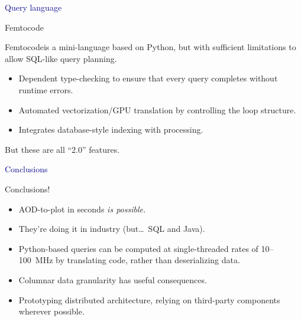 \documentclass{beamer}
\begin{document}
\begin{frame}
\begin{center}
\huge \textcolor{darkblue}{Query language}
\end{center}
\end{frame}

\begin{frame}{Femtocode}
\vspace{0.5 cm}

Femtocode\footnotemark[1] is a mini-language based on Python, but with sufficient limitations to allow SQL-like query planning.

\vspace{0.25 cm}
\begin{itemize}\setlength{\itemsep}{0.25 cm}
\item Dependent type-checking to ensure that every query completes without runtime errors.
\item Automated vectorization/GPU translation by controlling the loop structure.
\item Integrates database-style indexing with processing.
\end{itemize}

\vspace{0.25 cm}
But these are all ``2.0'' features.

\end{frame}

\begin{frame}
\begin{center}
\huge \textcolor{darkblue}{Conclusions}
\end{center}
\end{frame}

\begin{frame}{Conclusions!}
\vspace{0.5 cm}

\begin{itemize}\setlength{\itemsep}{0.5 cm}
\item AOD-to-plot in seconds {\it is possible.}
\item They're doing it in industry (but\ldots\ SQL and Java).
\item Python-based queries can be computed at single-threaded rates of 10--100~MHz by translating code, rather than deserializing data.
\item Columnar data granularity has useful consequences.
\item Prototyping distributed architecture, relying on third-party components wherever possible.
\end{itemize}
\end{frame}
\end{document}
